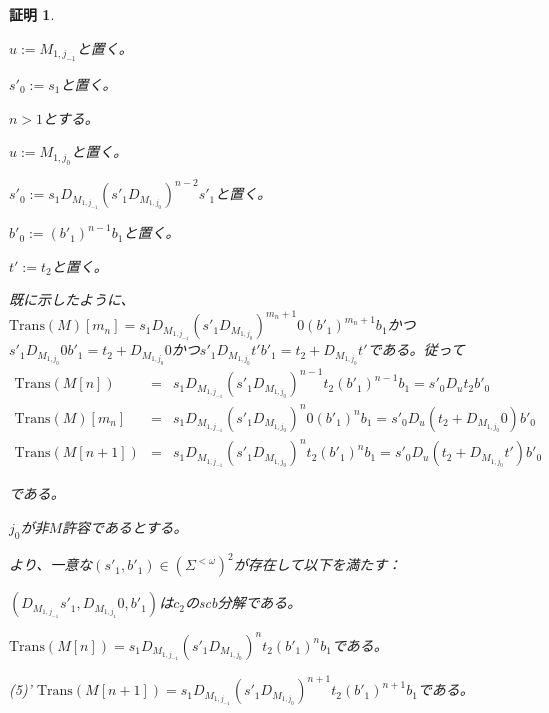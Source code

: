 \documentclass[dvipdfmx,uplatex]{jsarticle}
\theoremstyle{customnonumberbreakfortheorem}
\theoremstyle{customnonumberbreakforproof}
\newtheorem{hideableproof}{証明}
\begin{document}
\begin{hideableproof}
\begin{indented}
\begin{indented}
\begin{indented}
				\item \(u := M_{1,j_{-1}}\)と置く。
				\item \(s'_0 := s_1\)と置く。
			\end{indented}
			\item \(n > 1\)とする。
			\begin{indented}
				\item \(u := M_{1,j_0}\)と置く。
				\item \(s'_0 := s_1 D_{M_{1,j_{-1}}} (s'_1 D_{M_{1,j_0}})^{n-2} s'_1\)と置く。
			\end{indented}
			\item \(b'_0 := (b'_1)^{n-1} b_1\)と置く。
			\item \(t' := t_2\)と置く。
			\item 既に示したように、\(\textrm{Trans}(M)[m_n] = s_1 D_{M_{1,j_{-1}}} (s'_1 D_{M_{1,j_0}})^{m_n+1} 0 (b'_1)^{m_n+1} b_1\)かつ\(s'_1 D_{M_{1,j_0}} 0 b'_1 = t_2 + D_{M_{1,j_0}} 0\)かつ\(s'_1 D_{M_{1,j_0}} t' b'_1 = t_2 + D_{M_{1,j_0}} t'\)である。従って
			\begin{eqnarray*}
			\textrm{Trans}(M[n]) & = & s_1 D_{M_{1,j_{-1}}} (s'_1 D_{M_{1,j_0}})^{n-1} t_2 (b'_1)^{n-1} b_1 = s'_0 D_u t_2 b'_0 \\
			\textrm{Trans}(M)[m_n] & = & s_1 D_{M_{1,j_{-1}}} (s'_1 D_{M_{1,j_0}})^n 0 (b'_1)^n b_1 = s'_0 D_u(t_2 + D_{M_{1,j_0}} 0) b'_0 \\
			\textrm{Trans}(M[n+1]) & = & s_1 D_{M_{1,j_{-1}}} (s'_1 D_{M_{1,j_0}})^n t_2 (b'_1)^n b_1 = s'_0 D_u(t_2 + D_{M_{1,j_0}} t') b'_0
			\end{eqnarray*}
			\item である。
		\end{indented}
		\item
		\item \(j_0\)が非\(M\)許容であるとする。
		\begin{indented}
			\item {}より、一意な\((s'_1,b'_1) \in (\Sigma^{< \omega})^2\)が存在して以下を満たす：
			\begin{penumerate}
				\item \((D_{M_{1,j_{-1}}} s'_1,D_{M_{1,j_1}} 0,b'_1)\)は\(c_2\)のscb分解である。
				\setcounter{penumeratei}{4}
				\item \(\textrm{Trans}(M[n]) = s_1 D_{M_{1,j_{-1}}} (s'_1 D_{M_{1,j_0}})^n t_2 (b'_1)^n b_1\)である。
				\item[] (5)' \(\textrm{Trans}(M[n+1]) = s_1 D_{M_{1,j_{-1}}} (s'_1 D_{M_{1,j_0}})^{n+1} t_2 (b'_1)^{n+1} b_1\)である。

\end{penumerate}
\end{indented}
\end{indented}
\end{hideableproof}
\end{document}

